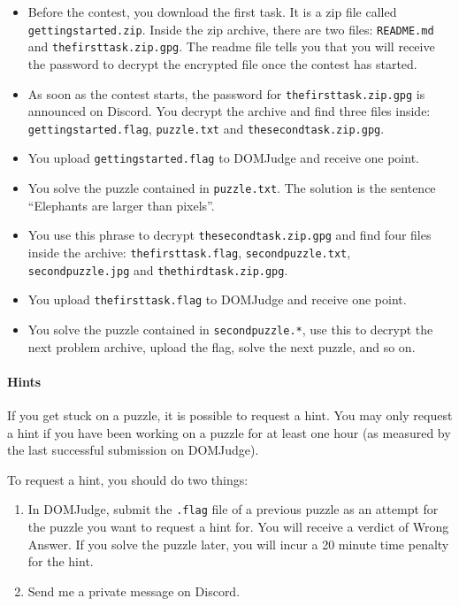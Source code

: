 \documentclass[fontsize=10pt,a4paper,DIV=12,parskip=half]{scrarticle}
\begin{document}
\begin{itemize}
	\item Before the contest, you download the first task. It is a zip file called
		\texttt{gettingstarted.zip}. Inside the zip archive, there are two files:
		\texttt{README.md} and \texttt{thefirsttask.zip.gpg}. The readme file tells
		you that you will receive the password to decrypt the encrypted file once
		the contest has started.
	\item As soon as the contest starts, the password for \texttt{thefirsttask.zip.gpg}
		is announced on Discord. You decrypt the archive and find three files inside:
		\texttt{gettingstarted.flag}, \texttt{puzzle.txt} and \texttt{thesecondtask.zip.gpg}.
	\item You upload \texttt{gettingstarted.flag} to DOMJudge and receive one point.
	\item You solve the puzzle contained in \texttt{puzzle.txt}. The solution is the
		sentence \enquote{Elephants are larger than pixels}.
	\item You use this phrase to decrypt \texttt{thesecondtask.zip.gpg} and find
		four files inside the archive: \texttt{thefirsttask.flag}, \texttt{secondpuzzle.txt},
		\texttt{secondpuzzle.jpg} and \texttt{thethirdtask.zip.gpg}.
	\item You upload \texttt{thefirsttask.flag} to DOMJudge and receive one point.
	\item You solve the puzzle contained in \texttt{secondpuzzle.*}, use this to decrypt the
		next problem archive, upload the flag, solve the next puzzle, and so on.
\end{itemize}

\paragraph{Hints}
If you get stuck on a puzzle, it is possible to request a hint. You may only
request a hint if you have been working on a puzzle for at least one hour
(as measured by the last successful submission on DOMJudge).

To request a hint, you should do two things:
\begin{enumerate}
	\item In DOMJudge, submit the \texttt{.flag} file of a previous puzzle as an attempt for the puzzle you
		want to request a hint for. You will receive a verdict of Wrong Answer. If you solve
		the puzzle later, you will incur a 20 minute time penalty for the hint.
	\item Send me a private message on Discord.
\end{enumerate}
\end{document}
